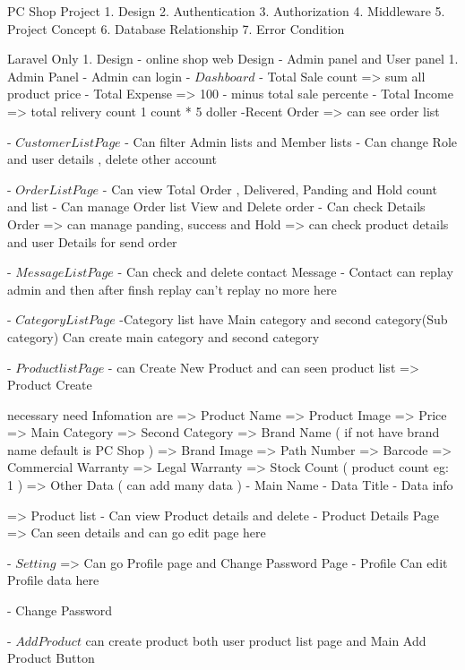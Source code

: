 PC Shop Project
1. Design
2. Authentication
3. Authorization
4. Middleware
5. Project Concept
6. Database Relationship
7. Error Condition

Laravel Only
1. Design
- online shop web Design
- Admin panel and User panel
1. Admin Panel
- Admin can login
- $Dashboard$
    - Total Sale count
        => sum all product price
    - Total Expense
        => 100 - minus total sale percente
    - Total Income
        => total relivery count
            1 count * 5 doller
    -Recent Order
        => can see order list

- $Customer List Page$
    - Can filter Admin lists and Member lists
    - Can change Role and user details , delete other account

- $Order List Page$
    - Can view Total Order , Delivered, Panding and Hold count and list
    - Can manage Order list
        View and Delete order
    - Can check Details Order
        => can manage  panding, success and Hold
        => can check product details and user Details for send order

- $Message List Page$
    - Can check and delete contact Message
    - Contact can replay admin and then after finsh replay can't replay no more here

- $Category List Page$
    -Category list have Main category and second category(Sub category)
    Can create main category and second category

- $Product list Page$
    - can Create New Product and can seen product list
    => Product Create

    necessary need Infomation are
        => Product Name
        => Product Image
        => Price
        => Main Category
        => Second Category
        => Brand Name ( if not have brand name default is PC Shop )
        => Brand Image
        => Path Number
        => Barcode
        => Commercial Warranty
        => Legal Warranty
        => Stock Count ( product count eg: 1 )
        => Other Data ( can add many data )
            - Main Name
            - Data Title
            - Data info

    => Product list
        - Can view Product details and delete
        - Product Details Page
            => Can seen details and can go edit page here

- $Setting$
    => Can go Profile page and Change Password Page
        - Profile
        Can edit Profile data here

        - Change Password

- $Add Product$
    can create product both user product list page and Main Add Product Button

